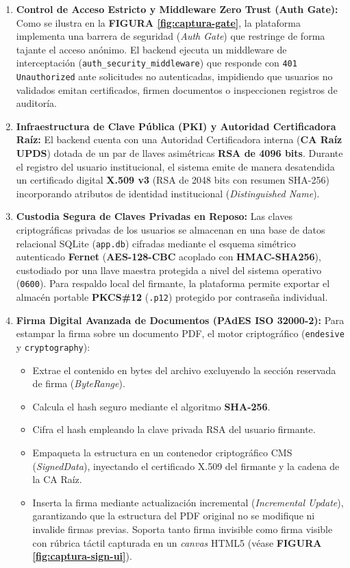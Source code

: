 \begin{enumerate}
  \item \textbf{Control de Acceso Estricto y Middleware Zero Trust (Auth Gate):} Como se ilustra en la \textbf{FIGURA \ref{fig:captura-gate}}, la plataforma implementa una barrera de seguridad (\textit{Auth Gate}) que restringe de forma tajante el acceso anónimo. El backend ejecuta un middleware de interceptación (\texttt{auth\_security\_middleware}) que responde con \texttt{401 Unauthorized} ante solicitudes no autenticadas, impidiendo que usuarios no validados emitan certificados, firmen documentos o inspeccionen registros de auditoría.
  
  \item \textbf{Infraestructura de Clave Pública (PKI) y Autoridad Certificadora Raíz:} El backend cuenta con una Autoridad Certificadora interna (\textbf{CA Raíz UPDS}) dotada de un par de llaves asimétricas \textbf{RSA de 4096 bits}. Durante el registro del usuario institucional, el sistema emite de manera desatendida un certificado digital \textbf{X.509 v3} (RSA de 2048 bits con resumen SHA-256) incorporando atributos de identidad institucional (\textit{Distinguished Name}).
  
  \item \textbf{Custodia Segura de Claves Privadas en Reposo:} Las claves criptográficas privadas de los usuarios se almacenan en una base de datos relacional SQLite (\texttt{app.db}) cifradas mediante el esquema simétrico autenticado \textbf{Fernet} (\textbf{AES-128-CBC} acoplado con \textbf{HMAC-SHA256}), custodiado por una llave maestra protegida a nivel del sistema operativo (\texttt{0600}). Para respaldo local del firmante, la plataforma permite exportar el almacén portable \textbf{PKCS\#12} (\texttt{.p12}) protegido por contraseña individual.
  
  \item \textbf{Firma Digital Avanzada de Documentos (PAdES ISO 32000-2):} Para estampar la firma sobre un documento PDF, el motor criptográfico (\texttt{endesive} y \texttt{cryptography}):
  \begin{itemize}
    \item Extrae el contenido en bytes del archivo excluyendo la sección reservada de firma (\textit{ByteRange}).
    \item Calcula el hash seguro mediante el algoritmo \textbf{SHA-256}.
    \item Cifra el hash empleando la clave privada RSA del usuario firmante.
    \item Empaqueta la estructura en un contenedor criptográfico CMS (\textit{SignedData}), inyectando el certificado X.509 del firmante y la cadena de la CA Raíz.
    \item Inserta la firma mediante actualización incremental (\textit{Incremental Update}), garantizando que la estructura del PDF original no se modifique ni invalide firmas previas. Soporta tanto firma invisible como firma visible con rúbrica táctil capturada en un \textit{canvas} HTML5 (véase \textbf{FIGURA \ref{fig:captura-sign-ui}}).
  \end{itemize}


\end{enumerate}
